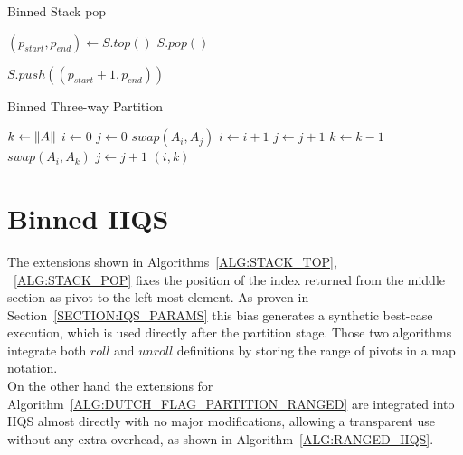 \begin{algorithm}
    \caption{Binned Stack pop}\label{ALG:STACK_POP}
    \begin{algorithmic}[1]
        \State $(p_{start}, p_{end}) \gets S.top()$
        \State $S.pop()$
    
            \State $S.push((p_{start}+1, p_{end}))$
        \EndIf
        \EndProcedure
\end{algorithmic}
\end{algorithm}

\begin{algorithm}
\caption{Binned Three-way Partition}\label{ALG:DUTCH_FLAG_PARTITION_RANGED}
\begin{algorithmic}[1]
    \State $k \gets \lVert A\rVert$
    \State $i \gets 0$
    \State $j \gets 0$
            \State $swap(A_i, A_j)$
            \State $i \gets i+1$
            \State $j \gets j+1$
            \State $k \gets k-1$
            \State $swap(A_i, A_k)$
        \Else
            \State $j \gets j+1$
        \EndIf
    \EndWhile
    \State \Return $(i,k)$
    \EndProcedure
\end{algorithmic}
\end{algorithm}

\section{Binned IIQS}
The extensions shown in Algorithms~\ref{ALG:STACK_TOP}, ~\ref{ALG:STACK_POP} fixes the position of the index returned from the middle section as pivot to the left-most element. As proven in Section~\ref{SECTION:IQS_PARAMS} this bias generates a synthetic best-case execution, which is used directly after the partition stage. Those two algorithms integrate both $roll$ and $unroll$ definitions by storing the range of pivots in a map notation.\\


On the other hand the extensions for Algorithm~\ref{ALG:DUTCH_FLAG_PARTITION_RANGED} are integrated into IIQS almost directly with no major modifications, allowing a transparent use without any extra overhead, as shown in Algorithm~\ref{ALG:RANGED_IIQS}.\\

